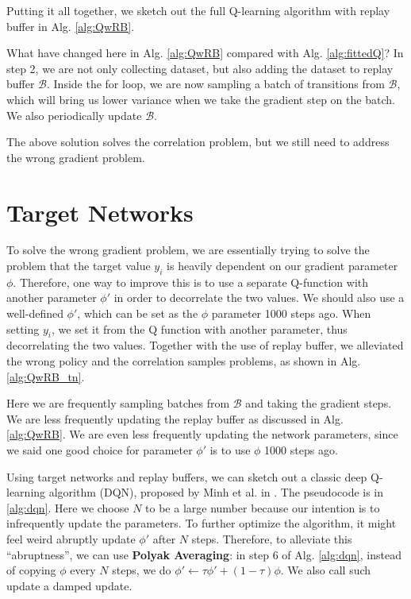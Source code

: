 Putting it all together, we sketch out the full Q-learning algorithm with replay buffer in Alg. \ref{alg:QwRB}.

What have changed here in Alg. \ref{alg:QwRB} compared with Alg. \ref{alg:fittedQ}? In step 2, we are not only collecting dataset, but also adding the dataset to replay buffer $\mathcal{B}$. Inside the for loop, we are now sampling a batch of transitions from $\mathcal{B}$, which will bring us lower variance when we take the gradient step on the batch. We also periodically update $\mathcal{B}$.

The above solution solves the correlation problem, but we still need to address the wrong gradient problem. 

\section{Target Networks}
To solve the wrong gradient problem, we are essentially trying to solve the problem that the target value $y_i$ is heavily dependent on our gradient parameter $\phi$. Therefore, one way to improve this is to use a separate Q-function with another parameter $\phi'$ in order to decorrelate the two values. We should also use a well-defined $\phi'$, which can be set as the $\phi$ parameter 1000 steps ago. When setting $y_i$, we set it from the Q function with another parameter, thus decorrelating the two values. Together with the use of replay buffer, we alleviated the wrong policy and the correlation samples problems, as shown in Alg. \ref{alg:QwRB_tn}.

Here we are frequently sampling batches from $\mathcal{B}$ and taking the gradient steps. We are less frequently updating the replay buffer as discussed in Alg. \ref{alg:QwRB}. We are even less frequently updating the network parameters, since we said one good choice for parameter $\phi'$ is to use $\phi$ 1000 steps ago.

Using target networks and replay buffers, we can sketch out a classic deep Q-learning algorithm (DQN), proposed by Minh et al. in \cite{mnih2013playing}. The pseudocode is in \ref{alg:dqn}. Here we choose $N$ to be a large number because our intention is to infrequently update the parameters. To further optimize the algorithm, it might feel weird abruptly update $\phi'$ after $N$ steps. Therefore, to alleviate this ``abruptness'', we can use \textbf{Polyak Averaging}: in step 6 of Alg. \ref{alg:dqn}, instead of copying $\phi$ every $N$ steps, we do $\phi' \leftarrow \tau\phi' + (1-\tau)\phi$. We also call such update a damped update.


